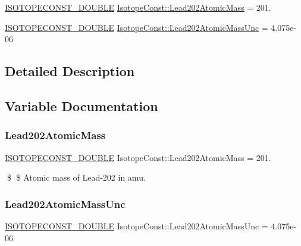 \begin{DoxyCompactItemize}
\item 
\mbox{\hyperlink{group___isotope_const-_macros_ga8f45a7272ce02c0b4c65c44636ed719a}{I\+S\+O\+T\+O\+P\+E\+C\+O\+N\+S\+T\+\_\+\+D\+O\+U\+B\+LE}} \mbox{\hyperlink{group___isotope_const-_lead-_pb202_ga5218da7bcd4e46611c87caf729dd8659}{Isotope\+Const\+::\+Lead202\+Atomic\+Mass}} = 201.
\item 
\mbox{\hyperlink{group___isotope_const-_macros_ga8f45a7272ce02c0b4c65c44636ed719a}{I\+S\+O\+T\+O\+P\+E\+C\+O\+N\+S\+T\+\_\+\+D\+O\+U\+B\+LE}} \mbox{\hyperlink{group___isotope_const-_lead-_pb202_ga249091b82e9d0c61a05ff5bcc3b12fa8}{Isotope\+Const\+::\+Lead202\+Atomic\+Mass\+Unc}} = 4.\+075e-\/06
\end{DoxyCompactItemize}


\subsection{Detailed Description}


\subsection{Variable Documentation}
\mbox{\label{group___isotope_const-_lead-_pb202_ga5218da7bcd4e46611c87caf729dd8659}} 
\subsubsection{\texorpdfstring{Lead202\+Atomic\+Mass}{Lead202AtomicMass}}
{\footnotesize\ttfamily \mbox{\hyperlink{group___isotope_const-_macros_ga8f45a7272ce02c0b4c65c44636ed719a}{I\+S\+O\+T\+O\+P\+E\+C\+O\+N\+S\+T\+\_\+\+D\+O\+U\+B\+LE}} Isotope\+Const\+::\+Lead202\+Atomic\+Mass = 201.}

\$ \$ Atomic mass of Lead-\/202 in amu. \mbox{\label{group___isotope_const-_lead-_pb202_ga249091b82e9d0c61a05ff5bcc3b12fa8}} 
\subsubsection{\texorpdfstring{Lead202\+Atomic\+Mass\+Unc}{Lead202AtomicMassUnc}}
{\footnotesize\ttfamily \mbox{\hyperlink{group___isotope_const-_macros_ga8f45a7272ce02c0b4c65c44636ed719a}{I\+S\+O\+T\+O\+P\+E\+C\+O\+N\+S\+T\+\_\+\+D\+O\+U\+B\+LE}} Isotope\+Const\+::\+Lead202\+Atomic\+Mass\+Unc = 4.\+075e-\/06}

